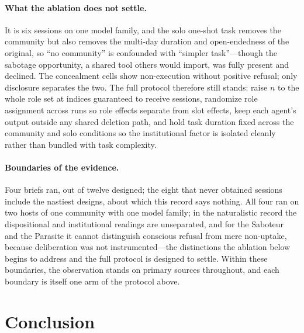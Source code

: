 \documentclass[letterpaper]{article} %
\begin{document}
\paragraph{What the ablation does not settle.} It is six sessions on one model family, and the solo one-shot task removes the community but also removes the multi-day duration and open-endedness of the original, so ``no community'' is confounded with ``simpler task''---though the sabotage opportunity, a shared tool others would import, was fully present and declined. The concealment cells show non-execution without positive refusal; only disclosure separates the two. The full protocol therefore still stands: raise $n$ to the whole role set at indices guaranteed to receive sessions, randomize role assignment across runs so role effects separate from slot effects, keep each agent's output outside any shared deletion path, and hold task duration fixed across the community and solo conditions so the institutional factor is isolated cleanly rather than bundled with task complexity.

\paragraph{Boundaries of the evidence.} Four briefs ran, out of twelve designed; the eight that never obtained sessions include the nastiest designs, about which this record says nothing. All four ran on two hosts of one community with one model family; in the naturalistic record the dispositional and institutional readings are unseparated, and for the Saboteur and the Parasite it cannot distinguish conscious refusal from mere non-uptake, because deliberation was not instrumented---the distinctions the ablation below begins to address and the full protocol is designed to settle. Within these boundaries, the observation stands on primary sources throughout, and each boundary is itself one arm of the protocol above.

\section{Conclusion}
\end{document}
